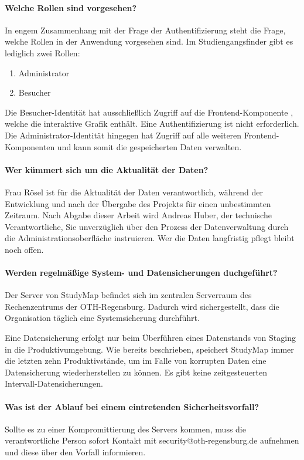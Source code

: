 \paragraph*{Welche Rollen sind vorgesehen?}
In engem Zusammenhang mit der Frage der Authentifizierung steht die Frage, welche Rollen in der Anwendung vorgesehen sind. Im Studiengangsfinder gibt es lediglich zwei Rollen:
\begin{enumerate}
    \item Administrator
    \item Besucher
\end{enumerate}
Die Besucher-Identität hat ausschließlich Zugriff auf die Frontend-Komponente , welche die interaktive Grafik enthält. Eine Authentifizierung ist nicht erforderlich. Die Administrator-Identität hingegen hat Zugriff auf alle weiteren Frontend-Komponenten und kann somit die gespeicherten Daten verwalten.

\paragraph*{Wer kümmert sich um die Aktualität der Daten?}
Frau Rösel ist für die Aktualität der Daten verantwortlich, während der Entwicklung und nach der Übergabe des Projekts für einen unbestimmten Zeitraum. Nach Abgabe dieser Arbeit wird Andreas Huber, der technische Verantwortliche, Sie unverzüglich über den Prozess der Datenverwaltung durch die Administrationsoberfläche instruieren. Wer die Daten langfristig pflegt bleibt noch offen.

\paragraph*{Werden regelmäßige System- und Datensicherungen duchgeführt?}
Der Server von StudyMap befindet sich im zentralen Serverraum des Rechenzentrums der OTH-Regensburg. Dadurch wird sichergestellt, dass die Organisation täglich eine Systemsicherung durchführt.

Eine Datensicherung erfolgt nur beim Überführen eines Datenstands von Staging in die Produktivumgebung. Wie bereits beschrieben, speichert StudyMap immer die letzten zehn Produktivstände, um im Falle von korrupten Daten eine Datensicherung wiederherstellen zu können. Es gibt keine zeitgesteuerten Intervall-Datensicherungen.

\paragraph*{Was ist der Ablauf bei einem eintretenden Sicherheitsvorfall?}
Sollte es zu einer Kompromittierung des Servers kommen, muss die verantwortliche Person sofort Kontakt mit security@oth-regensburg.de aufnehmen und diese über den Vorfall informieren.

